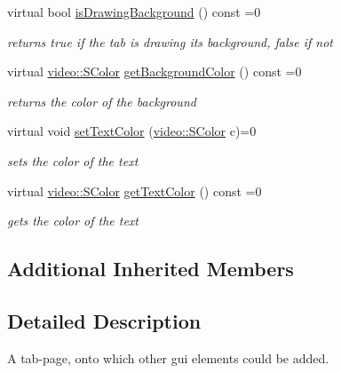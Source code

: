\begin{DoxyCompactItemize}
\mbox{\label{classirr_1_1gui_1_1IGUITab_ab357a99f63a7ecbd3da5adbc24f43e58}} 
virtual bool \hyperlink{classirr_1_1gui_1_1IGUITab_ab357a99f63a7ecbd3da5adbc24f43e58}{is\+Drawing\+Background} () const =0
\begin{DoxyCompactList}\small\item\em returns true if the tab is drawing its background, false if not \end{DoxyCompactList}\item 
\mbox{\label{classirr_1_1gui_1_1IGUITab_ab9c9bd6b40bf90482d429d9a87f7e06c}} 
virtual \hyperlink{classirr_1_1video_1_1SColor}{video\+::\+S\+Color} \hyperlink{classirr_1_1gui_1_1IGUITab_ab9c9bd6b40bf90482d429d9a87f7e06c}{get\+Background\+Color} () const =0
\begin{DoxyCompactList}\small\item\em returns the color of the background \end{DoxyCompactList}\item 
\mbox{\label{classirr_1_1gui_1_1IGUITab_a56f7e206931506705b3a54674d6b8603}} 
virtual void \hyperlink{classirr_1_1gui_1_1IGUITab_a56f7e206931506705b3a54674d6b8603}{set\+Text\+Color} (\hyperlink{classirr_1_1video_1_1SColor}{video\+::\+S\+Color} c)=0
\begin{DoxyCompactList}\small\item\em sets the color of the text \end{DoxyCompactList}\item 
\mbox{\label{classirr_1_1gui_1_1IGUITab_a91cd857c91bbbbe9a216adadf9ea3b8f}} 
virtual \hyperlink{classirr_1_1video_1_1SColor}{video\+::\+S\+Color} \hyperlink{classirr_1_1gui_1_1IGUITab_a91cd857c91bbbbe9a216adadf9ea3b8f}{get\+Text\+Color} () const =0
\begin{DoxyCompactList}\small\item\em gets the color of the text \end{DoxyCompactList}\end{DoxyCompactItemize}
\subsection*{Additional Inherited Members}


\subsection{Detailed Description}
A tab-\/page, onto which other gui elements could be added. 

